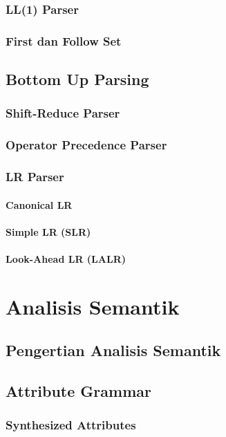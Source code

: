 \documentclass{book}
\begin{document}
         \subsection{LL(1) Parser}
         \subsection{First dan Follow Set}
    \section{Bottom Up Parsing}
         \subsection{Shift-Reduce Parser}
         \subsection{Operator Precedence Parser}
         \subsection{LR Parser}
              \subsubsection{Canonical LR}
              \subsubsection{Simple LR (SLR)}
              \subsubsection{Look-Ahead LR (LALR)}
            
\chapter{Analisis Semantik}
    \section{Pengertian Analisis Semantik}
    \section{Attribute Grammar}
         \subsection{Synthesized Attributes}
\end{document}

